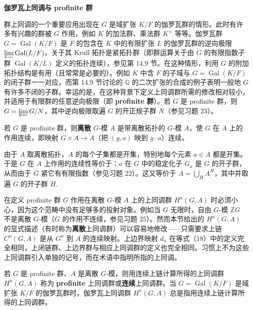 \noindent\textbf{伽罗瓦上同调与 profinite 群}

群上同调的一个重要应用出现在 \(G\) 是域扩张 \(K/F\) 的伽罗瓦群的情形。此时有许多有兴趣的群被 \(G\) 作用，例如 \(K\) 的加法群、乘法群 \(K^\times\) 等等。伽罗瓦群 \(G = \operatorname{Gal}(K/F)\) 是 \(F\) 的包含在 \(K\) 中的有限扩张 \(L\) 的伽罗瓦群的逆向极限 \(\varprojlim\operatorname{Gal}(L/F)\)，关于其 Krull 拓扑是紧拓扑群（即群运算关于由 \(G\) 的有限指数子群 \(\operatorname{Gal}(K/L)\) 定义的拓扑连续），参见第 14.9 节。在这种情形，利用 \(G\) 的附加拓扑结构是有用（且常常是必要的）。例如 \(K\) 中含 \(F\) 的子域与 \(G = \operatorname{Gal}(K/F)\) 的闭子群一一对应，而第 14.9 节讨论的 \(\mathbb{Q}\) 的二次扩张的合成的例子表明一般地 \(G\) 有许多不闭的子群。幸运的是，在这种背景下定义上同调群所需的修改相对较小，并适用于有限群的任意逆向极限（即 \textbf{profinite 群}）。若 \(G\) 是 profinite 群，则 \(G = \varprojlim G/N\)，其中逆向极限取遍 \(G\) 的开正规子群 \(N\)（参见习题 23）。

\begin{definition}
若 \(G\) 是 profinite 群，则\textbf{离散} \(G\)-模 \(A\) 是带离散拓扑的 \(G\)-模 \(A\)，使 \(G\) 在 \(A\) 上的作用连续，即映射 \(G \times A \to A\)（把 \((g,a)\) 映到 \(g \cdot a\)）连续。
\end{definition}

由于 \(A\) 取离散拓扑，\(A\) 的每个子集都是开集，特别地每个元素 \(a \in A\) 都是开集。于是 \(G\) 在 \(A\) 上作用的连续性等价于：\(a\) 在 \(G\) 中的稳定化子 \(G_a\) 是 \(G\) 的开子群，从而由于 \(G\) 紧它有有限指数（参见习题 22）。这又等价于 \(A = \bigcup_HA^H\)，其中并取遍 \(G\) 的开子群 \(H\).

在定义 profinite 群 \(G\) 作用在离散 \(G\)-模 \(A\) 上的上同调群 \(H^n(G, A)\) 时必须小心，因为这个范畴中没有足够多的投射对象。例如当 \(G\) 无限时，自由 \(G\)-模 \(\mathbb{Z}G\) 不是离散 \(G\)-模（\(G\) 的作用不连续，参见习题 25）。然而本节给出的 \(H^n(G, A)\) 的显式描述（有时称为\textbf{离散}上同调群）可以容易地修改——只需要求上链 \(C^n(G, A)\) 是从 \(G^n\) 到 \(A\) 的连续映射。上边界映射 \(d_n\) 在等式（18）中的定义完全相同，上闭链群、上边界群与相应上同调群的定义也完全相同。习惯上不为这些上同调群引入单独的记号，而在术语中指明所指的上同调。

\begin{definition}
若 \(G\) 是 profinite 群、\(A\) 是离散 \(G\)-模，则用连续上链计算所得的上同调群 \(H^n(G, A)\) 称为 \textbf{profinite} 上同调群或\textbf{连续}上同调群。当 \(G = \operatorname{Gal}(K/F)\) 是域扩张 \(K/F\) 的伽罗瓦群时，伽罗瓦上同调群 \(H^n(G, A)\) 总是指用连续上链计算所得的上同调群。
\end{definition}

